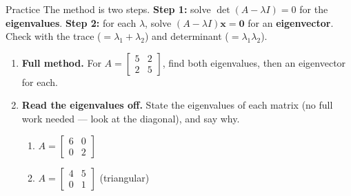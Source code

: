\documentclass[10pt]{article}
\newcommand{\xx}{\mathbf{x}}
\newcommand{\zero}{\mathbf{0}}
\begin{document}
\namedateperiod

\vspace{0.12in}

\begin{notesbox}{Practice}
The method is two steps. \textbf{Step 1:} solve $\det(A-\lambda I)=0$ for the \textbf{eigenvalues}.
\textbf{Step 2:} for each $\lambda$, solve $(A-\lambda I)\xx=\zero$ for an \textbf{eigenvector}. Check
with the trace ($=\lambda_1+\lambda_2$) and determinant ($=\lambda_1\lambda_2$).

\begin{enumerate}[leftmargin=1.9em, itemsep=12pt]
  \item \textbf{Full method.} For $A=\begin{bmatrix} 5 & 2 \\ 2 & 5 \end{bmatrix}$, find both
        eigenvalues, then an eigenvector for each.
  \item \textbf{Read the eigenvalues off.} State the eigenvalues of each matrix (no full work needed ---
        look at the diagonal), and say why.
    \begin{enumerate}[label=(\alph*), leftmargin=1.8em, itemsep=4pt]
      \item $A=\begin{bmatrix} 6 & 0 \\ 0 & 2 \end{bmatrix}$ \hfill {}
      \item $A=\begin{bmatrix} 4 & 5 \\ 0 & 1 \end{bmatrix}$ \;(triangular) \hfill {}

\end{enumerate}
\end{enumerate}
\end{notesbox}
\end{document}
